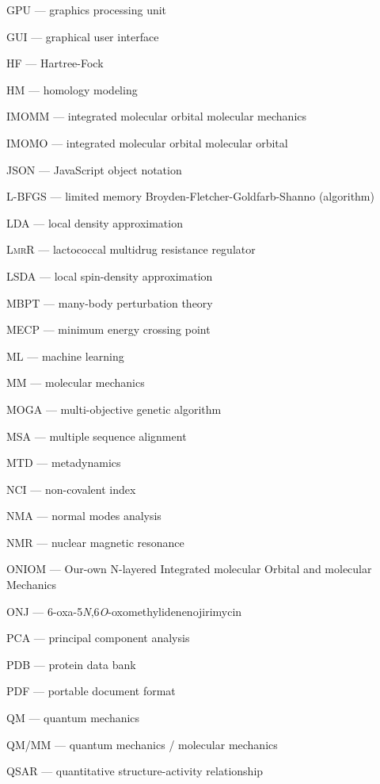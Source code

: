 \textsc{GPU} --- graphics processing unit

\textsc{GUI} --- graphical user interface

\textsc{HF} --- Hartree-Fock

\textsc{HM} --- homology modeling

\textsc{IMOMM} --- integrated molecular orbital molecular mechanics

\textsc{IMOMO} --- integrated molecular orbital molecular orbital

\textsc{JSON} --- JavaScript object notation

\textsc{L-BFGS} --- limited memory Broyden-Fletcher-Goldfarb-Shanno (algorithm)

\textsc{LDA} --- local density approximation

\textsc{LmrR} --- lactococcal multidrug resistance regulator

\textsc{LSDA} --- local spin-density approximation

\textsc{MBPT} --- many-body perturbation theory

\textsc{MECP} --- minimum energy crossing point

\textsc{ML} --- machine learning

\textsc{MM} --- molecular mechanics

\textsc{MOGA} --- multi-objective genetic algorithm

\textsc{MSA} --- multiple sequence alignment

\textsc{MTD} --- metadynamics

\textsc{NCI} --- non-covalent index

\textsc{NMA} --- normal modes analysis

\textsc{NMR} --- nuclear magnetic resonance

\textsc{ONIOM} --- Our-own N-layered Integrated molecular Orbital and molecular Mechanics

\textsc{ONJ} --- 6-oxa-5\textit{N},6\textit{O}-oxomethylidenenojirimycin

\textsc{PCA} --- principal component analysis

\textsc{PDB} --- protein data bank

\textsc{PDF} --- portable document format

\textsc{QM} --- quantum mechanics

\textsc{QM/MM} --- quantum mechanics / molecular mechanics

\textsc{QSAR} --- quantitative structure-activity relationship

